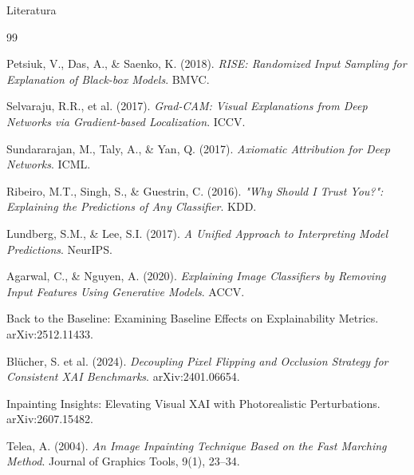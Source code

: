 \documentclass[aspectratio=169, 12pt]{beamer}
\begin{document}
\begin{frame}[allowframebreaks]{Literatura}
  \small
  \begin{thebibliography}{99}

    Petsiuk, V., Das, A., \& Saenko, K. (2018).
    \textit{RISE: Randomized Input Sampling for Explanation of Black-box Models}.
    BMVC.

    Selvaraju, R.R., et al. (2017).
    \textit{Grad-CAM: Visual Explanations from Deep Networks via Gradient-based Localization}.
    ICCV.

    Sundararajan, M., Taly, A., \& Yan, Q. (2017).
    \textit{Axiomatic Attribution for Deep Networks}.
    ICML.

    Ribeiro, M.T., Singh, S., \& Guestrin, C. (2016).
    \textit{"Why Should I Trust You?": Explaining the Predictions of Any Classifier}.
    KDD.

    Lundberg, S.M., \& Lee, S.I. (2017).
    \textit{A Unified Approach to Interpreting Model Predictions}.
    NeurIPS.

    Agarwal, C., \& Nguyen, A. (2020).
    \textit{Explaining Image Classifiers by Removing Input Features Using Generative Models}.
    ACCV.

    Back to the Baseline: Examining Baseline Effects on Explainability Metrics.
    arXiv:2512.11433.

    Blücher, S. et al. (2024).
    \textit{Decoupling Pixel Flipping and Occlusion Strategy for Consistent XAI Benchmarks}.
    arXiv:2401.06654.

    Inpainting Insights: Elevating Visual XAI with Photorealistic Perturbations.
    arXiv:2607.15482.

    Telea, A. (2004).
    \textit{An Image Inpainting Technique Based on the Fast Marching Method}.
    Journal of Graphics Tools, 9(1), 23–34.

  \end{thebibliography}
\end{frame}
\end{document}
